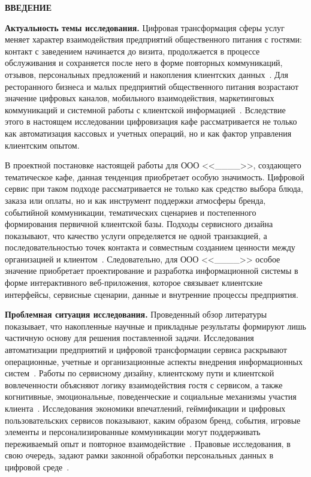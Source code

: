 \onehalfspacing

\renewcommand{\contentsname}{\centerline{\large СОДЕРЖАНИЕ}}
\tableofcontents

\newpage
\begin{center}
  \textbf{\large ВВЕДЕНИЕ}
\end{center}


\textbf{Актуальность темы исследования.} Цифровая трансформация сферы услуг меняет характер взаимодействия предприятий общественного питания с гостями: контакт с заведением начинается до визита, продолжается в процессе обслуживания и сохраняется после него в форме повторных коммуникаций, отзывов, персональных предложений и накопления клиентских данных~\cite{chernova2022, ziolkowska2021}. Для ресторанного бизнеса и малых предприятий общественного питания возрастают значение цифровых каналов, мобильного взаимодействия, маркетинговых коммуникаций и системной работы с клиентской информацией~\cite{chernova2022, ziolkowska2021}. Вследствие этого в настоящем исследовании цифровизация кафе рассматривается не только как автоматизация кассовых и учетных операций, но и как фактор управления клиентским опытом.

В проектной постановке настоящей работы для ООО <<\_\_\_\_>>, создающего тематическое кафе, данная тенденция приобретает особую значимость. Цифровой сервис при таком подходе рассматривается не только как средство выбора блюда, заказа или оплаты, но и как инструмент поддержки атмосферы бренда, событийной коммуникации, тематических сценариев и постепенного формирования первичной клиентской базы. Подходы сервисного дизайна показывают, что качество услуги определяется не одной транзакцией, а последовательностью точек контакта и совместным созданием ценности между организацией и клиентом~\cite{stickdorn2018, chathoth2016}. Следовательно, для ООО <<\_\_\_\_>> особое значение приобретает проектирование и разработка информационной системы в форме интерактивного веб-приложения, которое связывает клиентские интерфейсы, сервисные сценарии, данные и внутренние процессы предприятия.

\textbf{Проблемная ситуация исследования.} Проведенный обзор литературы показывает, что накопленные научные и прикладные результаты формируют лишь частичную основу для решения поставленной задачи. Исследования автоматизации предприятий и цифровой трансформации сервиса раскрывают операционные, учетные и организационные аспекты внедрения информационных систем~\cite{utkin_baldin_2003, chernova2022, ziolkowska2021}. Работы по сервисному дизайну, клиентскому пути и клиентской вовлеченности объясняют логику взаимодействия гостя с сервисом, а также когнитивные, эмоциональные, поведенческие и социальные механизмы участия клиента~\cite{stickdorn2018, brodie2011, vivek2012, pansari2017}. Исследования экономики впечатлений, геймификации и цифровых пользовательских сервисов показывают, каким образом бренд, события, игровые элементы и персонализированные коммуникации могут поддерживать переживаемый опыт и повторное взаимодействие~\cite{pine1998, deterding2011, xu2017, rita2022, londono2024}. Правовые исследования, в свою очередь, задают рамки законной обработки персональных данных в цифровой среде~\cite{kazakevich2021, moric2024}.

